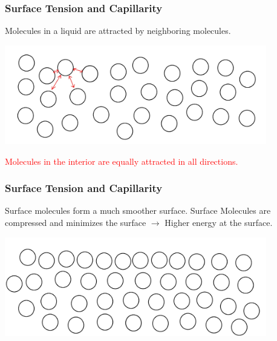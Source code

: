 \documentclass[]{beamer}
\begin{document}
\begin{frame}

\frametitle{Surface Tension and Capillarity}

Molecules in a liquid are attracted by
neighboring molecules.

  \begin{center}
  \includegraphics[height=1.7in]{images2/surfacet3.jpg}
\end{center}


\textcolor{red}{Molecules in the
interior are equally
attracted in all
directions.}



 \end{frame}



\begin{frame}

\frametitle{Surface Tension and Capillarity}

Surface molecules form a much smoother surface.
\vspace{3mm}
\pause
Surface Molecules are compressed and minimizes the surface $\rightarrow$ \pause Higher energy at the surface.

  \begin{center}
  \includegraphics[height=1.7in]{images2/surfacet5.jpg}
\end{center}





 \end{frame}

\end{document}
